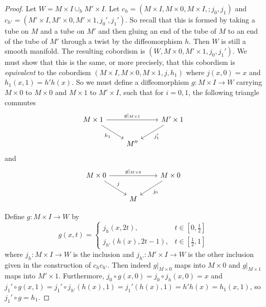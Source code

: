 \documentclass[reqno]{amsart}
\theoremstyle{definition}
\theoremstyle{remark}
\begin{document}
    \begin{proof}
        Let
        $W = M \times I \cup_h M' \times I$.
        Let $c_h = \left( M \times I, M \times 0,
        M \times I, ; j_0, j_1 \right) $ and
        $c_{h'} = \left( 
        M' \times I, M' \times 0, M' \times 1,
    j_0', j_1' \right) $.
        So recall that this is formed by taking a tube
        on $M$ and a tube on $M'$ and then gluing an end
        of the tube of $M$ to an end of the tube of $M'$ through
        a twist by the diffeomorphism $h$. Then
        $W$ is still a smooth manifold.
        The resulting cobordism is
        $\left( W, M \times 0, M' \times 1,
        j_0, j_1' \right) $.
        We must show that this is the same, or more
        precisely, that this cobordism is
        \textit{equivalent} to the
        cobordism
        $\left( M \times I,
        M \times 0, M\times 1, j, h_1\right) $ where
        $j(x,0) = x$ and
        $h_1(x,1) = h'h (x)$.
        So we must define a
        diffeomorphism
        $g \colon M \times I \to W$ carrying
        $M \times 0$ to $M \times 0$ and
        $M \times 1$ to $M' \times I$, such that
        for $i = 0,1$, the following triangle commutes
        \begin{equation*}
        \begin{tikzcd}
            M \times 1 \ar[rr, "g|_{M \times 1}"] \ar[dr, "h_1"']
            && M' \times 1 \ar[dl, "j_1'"] \\
                               & M'' &
        \end{tikzcd}
        \end{equation*}
        and
        \begin{equation*}
        \begin{tikzcd}
            M \times 0 \ar[rr, "g|_{M \times 0}"] 
            \ar[dr, "j"] && M \times 0 \ar[dl, "j_0"]\\
                                       & M &
        \end{tikzcd}
        \end{equation*}

        Define
        $g \colon M \times I \to W$ by
        \[
        g(x,t) =
        \begin{cases}
            j_h(x,2t),& t \in \left[ 0 , \frac{1}{2} \right] \\
            j_{h'}\left( h(x), 2t-1 \right) ,& t\in 
            \left[ \frac{1}{2},1 \right] 
        \end{cases}
        \] 
        where
        $j_{h} \colon
        M \times I \to W$ is the inclusion and
        $j_{h'} \colon M' \times I \to W$ is
        the other inclusion given in the
        construction of
        $c_h c_{h'}$.
        Then indeed
        $g|_{M \times 0}$ maps
        into $M \times 0$ and
        $g|_{M \times 1}$ maps into
        $M' \times 1$.
        Furthermore,
        $j_0 \circ g(x,0) = 
        j_0 \circ j_h \left( x,0 \right) 
        = x$ and
        $j_1' \circ g(x,1) = 
        j_1' \circ j_{h'}\left( h(x),1 \right) 
        =j_1'  \left( h(x),1 \right) 
        = h'h(x)
        = h_1(x,1)$, so
        $j_1' \circ g = h_1$.
    \end{proof}
\end{document}
